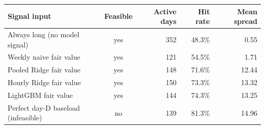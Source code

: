\begin{tabular}{lcrrr}
\toprule
Signal input & Feasible & Active days & Hit rate & Mean spread \\
\midrule
Always long (no model signal) & yes & 352 & 48.3\% & 0.55 \\
Weekly naive fair value & yes & 121 & 54.5\% & 1.71 \\
Pooled Ridge fair value & yes & 148 & 71.6\% & 12.44 \\
Hourly Ridge fair value & yes & 150 & 73.3\% & 13.32 \\
LightGBM fair value & yes & 144 & 74.3\% & 13.25 \\
Perfect day-D baseload (infeasible) & no & 139 & 81.3\% & 14.96 \\
\bottomrule
\end{tabular}
